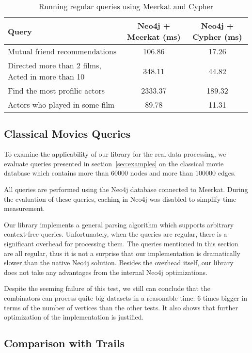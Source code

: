 \begin{table*}[t]
\small
\centering
\caption{Running regular queries using Meerkat and Cypher}
\label{table:movies}
\begin{tabular}{|l|c|c|}
\hline
{Query} &
{Neo4j + Meerkat (ms)} &
{Neo4j + Cypher (ms)} \\
\hline
\hline
Mutual friend recommendations & 106.86 & 17.26 \\
Directed more than 2 films, Acted in more than 10 & 348.11 & 44.82 \\
Find the most profilic actors & 2333.37 & 189.32 \\
Actors who played in some film & 89.78 & 11.31 \\
\hline
\end{tabular}
\end{table*}

\subsection{Classical Movies Queries}

To examine the applicability of our library for the real data processing, we evaluate queries presented in section~\ref{sec:examples} on the classical movie database which contains more than 60000 nodes and more than 100000 edges.

All queries are performed using the Neo4j database connected to Meerkat.
During the evaluation of these queries, caching in Neo4j was disabled to simplify time measurement.

Our library implements a general parsing algorithm which supports arbitrary context-free queries.
Unfortunately, when the queries are regular, there is a significant overhead for processing them.
The queries mentioned in this section are all regular, thus it is not a surprise that our implementation is dramatically slower than the native Neo4j solution. Besides the overhead itself, our library does not take any advantages from the internal Neo4j optimizations.

Despite the seeming failure of this test, we still can conclude that the combinators can process quite big datasets in a reasonable time: 6 times bigger in terms of the number of vertices than the other tests.
It also shows that further optimization of the implementation is justified.

\subsection{Comparison with Trails}

